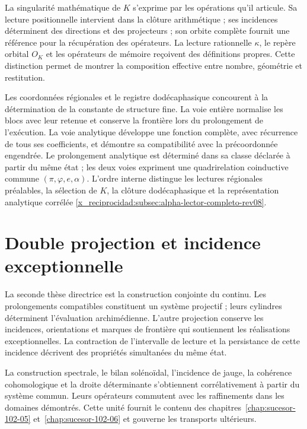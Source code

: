 La singularité mathématique de \(K\) s’exprime par les opérations qu’il articule. Sa lecture positionnelle intervient dans la clôture arithmétique ; ses incidences déterminent des directions et des projecteurs ; son orbite complète fournit une référence pour la récupération des opérateurs. La lecture rationnelle \(\kappa\), le repère orbital \(O_K\) et les opérateurs de mémoire reçoivent des définitions propres. Cette distinction permet de montrer la composition effective entre nombre, géométrie et restitution.

Les coordonnées régionales et le registre dodécaphasique concourent à la détermination de la constante de structure fine. La voie entière normalise les blocs avec leur retenue et conserve la frontière lors du prolongement de l’exécution. La voie analytique développe une fonction complète, avec récurrence de tous ses coefficients, et démontre sa compatibilité avec la précoordonnée engendrée. Le prolongement analytique est déterminé dans sa classe déclarée à partir du même état ; les deux voies expriment une quadrirelation coinductive commune \((\pi,\varphi,e,\alpha)\). L’ordre interne distingue les lectures régionales préalables, la sélection de \(K\), la clôture dodécaphasique et la représentation analytique corrélée \ref{x_reciprocidad:subsec:alpha-lector-completo-rev08}.

\section*{Double projection et incidence exceptionnelle}

La seconde thèse directrice est la construction conjointe du continu. Les prolongements compatibles constituent un système projectif ; leurs cylindres déterminent l’évaluation archimédienne. L’autre projection conserve les incidences, orientations et marques de frontière qui soutiennent les réalisations exceptionnelles. La contraction de l’intervalle de lecture et la persistance de cette incidence décrivent des propriétés simultanées du même état.

La construction spectrale, le bilan solénoïdal, l’incidence de jauge, la cohérence cohomologique et la droite déterminante s’obtiennent corrélativement à partir du système commun. Leurs opérateurs commutent avec les raffinements dans les domaines démontrés. Cette unité fournit le contenu des chapitres~\ref{chap:sucesor-102-05} et~\ref{chap:sucesor-102-06} et gouverne les transports ultérieurs.

